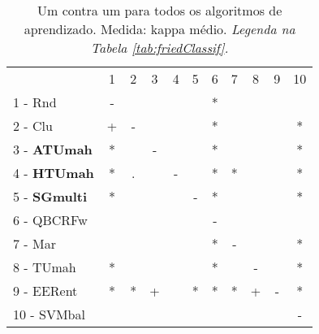 \begin{table}[h]
\caption{Um contra um para todos os algoritmos de aprendizado. Medida: kappa médio. \textit{Legenda na Tabela \ref{tab:friedClassif}.}}
\begin{center}\begin{tabular}{lcc|cc|cc|cc|cc}
 			& 1 & 2 & 3 & 4 & 5 & 6 & 7 & 8 & 9 & 10\\
1 - Rnd  	& - &   &   &   &   & * &   &   &   &   \\
2 - Clu  	& + & - &   &   &   & * &   &   &   & * \\ \hline
3 - \textbf{ATUmah}	& * &   & - &   &   & * &   &   &   & * \\
4 - \textbf{HTUmah}	& * & . &   & - &   & * & * &   &   & * \\ \hline
5 - \textbf{SGmulti}	& * &   &   &   & - & * &   &   &   & * \\
6 - QBCRFw	&   &   &   &   &   & - &   &   &   &   \\ \hline
7 - Mar  	&   &   &   &   &   & * & - &   &   & * \\
8 - TUmah	& * &   &   &   &   & * &   & - &   & * \\ \hline
9 - EERent	& * & * & + &   & * & * & * & + & - & * \\
10 - SVMbal	&   &   &   &   &   &   &   &   &   & - \\ \hline\end{tabular}

\label{stratsALCKappaFriedAll50}
\end{center}
\end{table}